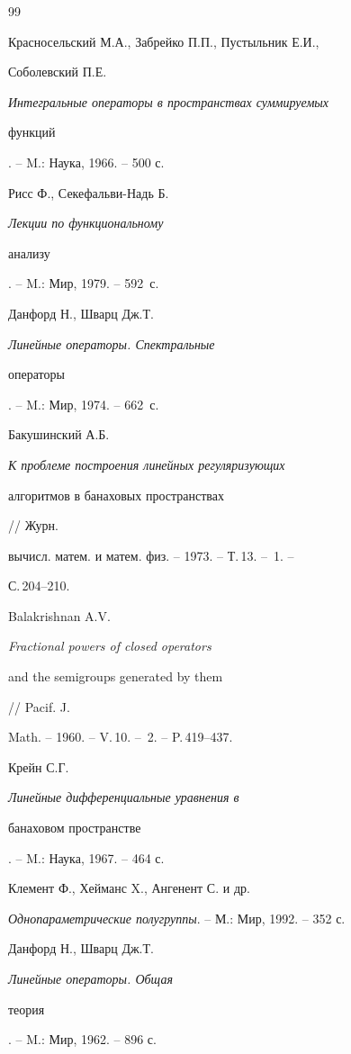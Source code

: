 \begin{thebibliography}{99}


Красносельский М.А., Забрейко П.П., Пустыльник Е.И., 


Соболевский П.Е. {\em Интегральные операторы в пространствах суммируемых 


функций}. -- M.: Наука, 1966. -- 500 с. 




Рисс Ф., Секефальви-Надь Б. {\em Лекции по функциональному 


анализу}. -- M.: Мир, 1979. -- 592~с. 




Данфорд Н., Шварц Дж.Т. {\em Линейные операторы. Спектральные 


операторы}. -- M.: Мир, 1974. -- 662~с. 




Бакушинский А.Б. {\em К проблеме построения линейных регуляризующих 


алгоритмов в банаховых пространствах} // Журн. 


вычисл. матем. и матем. физ. -- 1973. -- Т.\,13. -- \No\,1. -- 


С.\,204--210. 




Balakrishnan A.V. {\em Fractional powers of closed operators 


and the semigroups generated by them} // Pacif. J. 


Math. -- 1960. -- V.\,10. -- \No\,2. -- P.\,419--437. 




Крейн С.Г. {\em Линейные дифференциальные уравнения в 


банаховом пространстве}. -- M.: Наука, 1967. -- 464 с. 




Клемент Ф., Хейманс X., Ангенент С. и др. 


{\em Однопараметрические полугруппы}. -- М.: Мир, 1992. -- 352 с. 




Данфорд Н., Шварц Дж.Т. {\em Линейные операторы. Общая 


теория}. -- M.: Мир, 1962. -- 896 с. 


 


\end{thebibliography} 


 


\vskip 2cm 


 






 


\label{end} 


 


